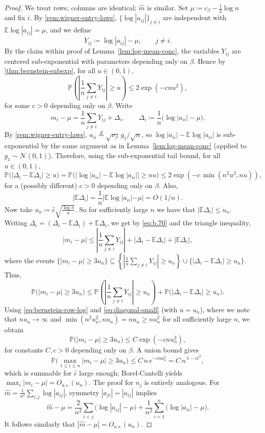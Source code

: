 \documentclass[11pt,a4paper]{article}
\newcommand{\be}{\begin{equation}}
\newcommand{\ee}{\end{equation}}
\newcommand{\Prob}{\mathbb{P}}
\newcommand{\E}{\mathbb{E}}
\begin{document}
\begin{proof}
We treat rows; columns are identical; $\hat m$ is similar. Set $\mu\coloneq c_\beta-\tfrac12\log n$ and fix $i$. By \cref{rem:wigner-entry-laws}, $\{\log|a_{ij}|\}_{j\ne i}$ are independent with $\E\log|a_{ij}|=\mu$, and we define
\be
Y_{ij}\coloneq \log|a_{ij}|-\mu,\qquad j\ne i.
\ee
By the claim within proof of Lemma~\ref{lem:log-mean-conc}, the variables $Y_{ij}$ are centered sub-exponential with parameters depending only on $\beta$. Hence by \cref{thm:bernstein-subexp}, for all $u\in(0,1)$,
\begin{equation}\label{eq:bernstein-row-log}
\Prob\!\left(\left|\frac1n\sum_{j\ne i}Y_{ij}\right|\geq u\right)\le 2\exp(-c n u^2),
\end{equation}
for some $c>0$ depending only on $\beta$. Write
\begin{equation}\label{eq:b.70}
m_i-\mu=\frac1n\sum_{j\ne i}Y_{ij}+\Delta_i,
\qquad
\Delta_i\coloneq \frac1n\big(\log|a_{ii}|-\mu\big).
\end{equation}
By \cref{rem:wigner-entry-laws}, $a_{ii}\stackrel{d}{=}\sqrt{\nu_\beta}\,g_1/\sqrt n$, so $\log|a_{ii}|-\E\log|a_{ii}|$ is sub-exponential by the same argument as in Lemma~\ref{lem:log-mean-conc} (applied to $g_1\sim\mathcal N(0,1)$). Therefore, using the sub-exponential tail bound, for all $u\in(0,1)$,
\begin{equation}\label{eq:diagonal-small}
\Prob\big(|\Delta_i-\E\Delta_i|\geq u\big)
=
\Prob\Big(\big|\log|a_{ii}|-\E\log|a_{ii}|\big|\geq nu\Big)
\le 2\exp(-c\,\min(n^2u^2,n u)),
\end{equation}
for a (possibly different) $c>0$ depending only on $\beta$. Also, 
\be
|\E\Delta_i|=\frac1n|\E\log|a_{ii}|-\mu|=O(1/n).
\ee
Now take $u_n\coloneq \hat{c}\sqrt{\frac{\log n}{n}}$. So for sufficiently large $n$ we have that $|\E\Delta_i|\le u_n$. Writing $\Delta_i=(\Delta_i-\E\Delta_i)+\E\Delta_i$, we get by \cref{eq:b.70} and the triangle inequality,
\be
|m_i-\mu|
\le \left|\frac1n\sum_{j\ne i}Y_{ij}\right|+|\Delta_i-\E\Delta_i|+|\E\Delta_i|,
\ee
where the events $\{|m_i-\mu|\geq 3u_n\}\subseteq\left\{\left|\frac1n\sum_{j\ne i}Y_{ij}\right|\geq u_n\right\}\cup\{|\Delta_i-\E\Delta_i|\geq u_n\}$. Thus,
\be
\Prob\big(|m_i-\mu|\geq 3u_n\big)
\le
\Prob\!\left(\left|\frac1n\sum_{j\ne i}Y_{ij}\right|\geq u_n\right)
+\Prob\big(|\Delta_i-\E\Delta_i|\geq u_n\big).
\ee
Using \cref{eq:bernstein-row-log} and \cref{eq:diagonal-small} (with $u=u_n$), where we note that $nu_n\to\infty$ and $\min(n^2u_n^2,nu_n)=nu_n\ge n u_n^2$ for all sufficiently large $n$, we obtain
\be
\Prob\big(|m_i-\mu|\geq 3u_n\big)\le C\exp(-c n u_n^2),
\ee
for constants $C,c>0$ depending only on $\beta$. A union bound gives
\be
\Prob\Big(\max_{1\le i\le n}|m_i-\mu|\geq 3u_n\Big)
\le C\,n\,e^{-c n u_n^2}
= C\,n^{\,1-c{\hat{c}}^2},
\ee
which is summable for $\hat{c}$ large enough; Borel-Cantelli yields $\max_i|m_i-\mu|=O_{a.s.}(u_n)$. The proof for $n_j$ is entirely analogous. For $\hat m=\frac1{n^2}\sum_{i,j}\log|a_{ij}|$, symmetry $|a_{ji}|=|a_{ij}|$ implies
\be
\hat m-\mu
=\frac{2}{n^2}\sum_{i<j}\big(\log|a_{ij}|-\mu\big)
+\frac{1}{n^2}\sum_{i=1}^n\big(\log|a_{ii}|-\mu\big).
\ee
It follows similarly that $|\hat m-\mu|=O_{a.s.}(u_n)$.
\end{proof}
\end{document}
